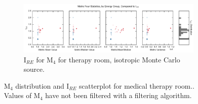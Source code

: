 \begin{figure}[htb!]\ContinuedFloat
  \centering
  \begin{subfigure}[t]{\textwidth}
    \includegraphics[width=\linewidth]{./chapters/characterization_probs/figures/char/therapy_iso/metric_four_err_stats_full.pdf}
    \caption{I$_{RE}$ for M$_4$ for therapy room, isotropic Monte
    Carlo
  source.}
    \label{fig:M4statsisotherapy}
  \end{subfigure}
  \caption[M$_4$ distribution and trends, unfiltered, for medical therapy room.]
  {M$_4$ distribution and I$_{RE}$ scatterplot for
  medical therapy room.. Values of M$_4$ have not been filtered with a filtering
algorithm.}
  \label{fig:therapyplots}
\end{figure}

